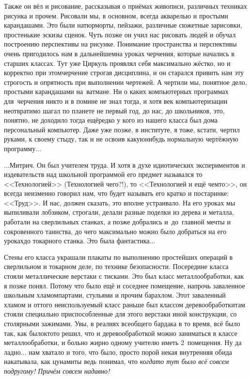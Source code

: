 Также он вёл и рисование, рассказывая о приёмах живописи, различных техниках рисунка и прочем. Рисовали мы, в основном, всегда акварелью и простыми карандашами. Это были натюрморты, пейзажи, различные сюжетные зарисовки, простенькие эскизы сценок. Чуть позже он учил нас рисовать людей и обучал построению перспективы на рисунке. Понимание пространства и перспективы очень пригодилось нам в дальнейшем\mdash на уроках черчения, которые начались в старших классах. Тут уже Циркуль проявлял себя максимально жёстко, но и корректно при этом\mdash черчение строгая дисциплина, и он старался привить нам эту строгость и опрятность при выполнении чертежей. А чертили мы, понятное дело, простыми карандашами на~ватмане. Ни о каких компьютерных программах для~черчения никто и в помине не знал тогда, и хотя век компьютеризации неотвратимо шагал по планете не первый год, до нас, до школьников, это, понятно, не доходило тогда ещё\mdash редко у кого из нашего класса был дома персональный компьютер. Даже уже позже, в институте, я тоже, кстати, чертил руками, к своему стыду, так и не освоив какую\sdash нибудь нормальную чертёжную программу$\ldots$

\vspace{1.0cm}
$\ldots$Митрич. Он был учителем труда. И хотя в духе идиотических экспериментов и издевательств над школьной программой его предмет назывался то <<Технологией>> (Технологией чего?!), то <<Технологией и ещё чем\sdash то>>, он всегда неизменно говорил нам, что будет называть его кратко и по\sdash старинке: <<Труд>>. И нас, должен сказать, это вполне устраивало. На его уроках мы выпиливали лобзиком, строгали, делали разные поделки из дерева и металла, работали на сверлильных станках, а позже добрались и~до~главной мечты и сокровенного таинства, до чего максимально можно было добраться на его уроках\mdash до токарного станка. Это была фантастика$\ldots$

Стены его класса украшали плакаты по выполнению простейших операций в сверлильном и токарном деле, по технике безопасности. Посередине класса стояли металлические верстаки с тисками. Это был класс металлообработки, как я позже понял. Потому что было ещё и соседнее помещение, напрочь заваленное школьным хламом\mdash партами, стульями и прочим барахлом. Этот заваленный хламом и оттого неиспользуемый класс раньше был классом деревообработки\mdash там стояли специально приспособленные для этого верстаки иной конструкции, со столярными зажимами. Увы, в реалиях всеобщего бардака в то время, всё было так, как было\mdash кто\sdash то решил, что и деревообработкой можно заниматься в классе металлообработки, и больно жирно одному учителю иметь 2~помещения. Ну да ладно$\ldots$ нам хватало и того, что было, просто порой некая внутренняя обида накатывала, как цунами\mdash ты ведь понимал, что \textit{когда\sdash то тут было всё совсем по\sdash другому! Причём совсем надавно!} 


